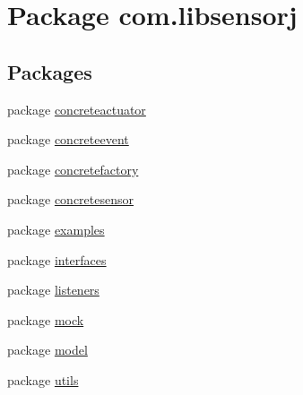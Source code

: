 \hypertarget{namespacecom_1_1libsensorj}{}\section{Package com.\+libsensorj}
\label{namespacecom_1_1libsensorj}
\subsection*{Packages}
\begin{DoxyCompactItemize}
\item 
package \hyperlink{namespacecom_1_1libsensorj_1_1concreteactuator}{concreteactuator}
\item 
package \hyperlink{namespacecom_1_1libsensorj_1_1concreteevent}{concreteevent}
\item 
package \hyperlink{namespacecom_1_1libsensorj_1_1concretefactory}{concretefactory}
\item 
package \hyperlink{namespacecom_1_1libsensorj_1_1concretesensor}{concretesensor}
\item 
package \hyperlink{namespacecom_1_1libsensorj_1_1examples}{examples}
\item 
package \hyperlink{namespacecom_1_1libsensorj_1_1interfaces}{interfaces}
\item 
package \hyperlink{namespacecom_1_1libsensorj_1_1listeners}{listeners}
\item 
package \hyperlink{namespacecom_1_1libsensorj_1_1mock}{mock}
\item 
package \hyperlink{namespacecom_1_1libsensorj_1_1model}{model}
\item 
package \hyperlink{namespacecom_1_1libsensorj_1_1utils}{utils}
\end{DoxyCompactItemize}
